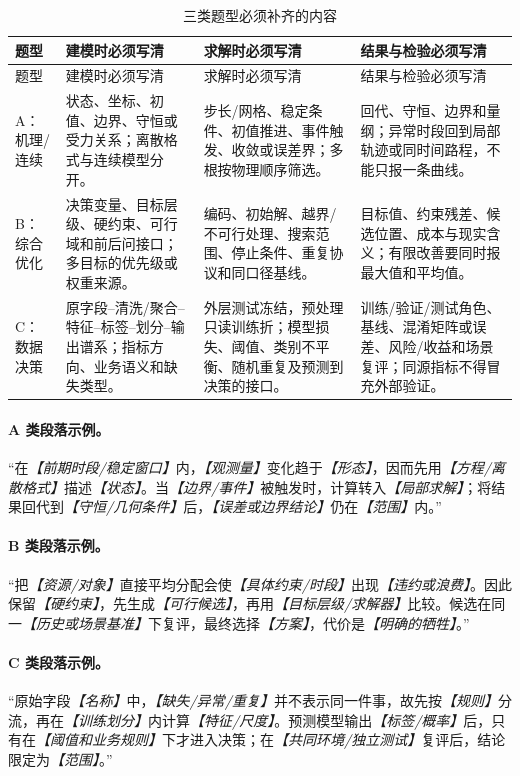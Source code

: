 \documentclass[UTF8,zihao=-4]{ctexart}
\newcommand{\slot}[1]{\textcolor{inkblue}{\textit{【#1】}}}
\begin{document}
\begin{longtable}{p{1.6cm}p{4.4cm}p{4.5cm}p{4.3cm}}
\caption{三类题型必须补齐的内容}\label{tab:template-abc-slots}\\
\toprule
题型 & 建模时必须写清 & 求解时必须写清 & 结果与检验必须写清\\
\midrule
\endfirsthead
\toprule
题型 & 建模时必须写清 & 求解时必须写清 & 结果与检验必须写清\\
\midrule
\endhead
A：机理/连续 & 状态、坐标、初值、边界、守恒或受力关系；离散格式与连续模型分开。 & 步长/网格、稳定条件、初值推进、事件触发、收敛或误差界；多根按物理顺序筛选。 & 回代、守恒、边界和量纲；异常时段回到局部轨迹或同时间路程，不能只报一条曲线。\\
B：综合优化 & 决策变量、目标层级、硬约束、可行域和前后问接口；多目标的优先级或权重来源。 & 编码、初始解、越界/不可行处理、搜索范围、停止条件、重复协议和同口径基线。 & 目标值、约束残差、候选位置、成本与现实含义；有限改善要同时报最大值和平均值。\\
C：数据决策 & 原字段--清洗/聚合--特征--标签--划分--输出谱系；指标方向、业务语义和缺失类型。 & 外层测试冻结，预处理只读训练折；模型损失、阈值、类别不平衡、随机重复及预测到决策的接口。 & 训练/验证/测试角色、基线、混淆矩阵或误差、风险/收益和场景复评；同源指标不得冒充外部验证。\\
\bottomrule
\end{longtable}

\paragraph{A 类段落示例。}“在\slot{前期时段/稳定窗口}内，\slot{观测量}变化趋于\slot{形态}，因而先用\slot{方程/离散格式}描述\slot{状态}。当\slot{边界/事件}被触发时，计算转入\slot{局部求解}；将结果回代到\slot{守恒/几何条件}后，\slot{误差或边界结论}仍在\slot{范围}内。”

\paragraph{B 类段落示例。}“把\slot{资源/对象}直接平均分配会使\slot{具体约束/时段}出现\slot{违约或浪费}。因此保留\slot{硬约束}，先生成\slot{可行候选}，再用\slot{目标层级/求解器}比较。候选在同一\slot{历史或场景基准}下复评，最终选择\slot{方案}，代价是\slot{明确的牺牲}。”

\paragraph{C 类段落示例。}“原始字段\slot{名称}中，\slot{缺失/异常/重复}并不表示同一件事，故先按\slot{规则}分流，再在\slot{训练划分}内计算\slot{特征/尺度}。预测模型输出\slot{标签/概率}后，只有在\slot{阈值和业务规则}下才进入决策；在\slot{共同环境/独立测试}复评后，结论限定为\slot{范围}。”
\end{document}
